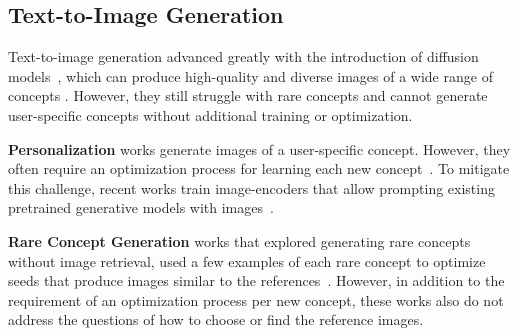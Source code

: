 \vspace{-4pt}
\subsection{Text-to-Image Generation}
Text-to-image generation advanced greatly with the introduction of diffusion models~\cite{ho2020denoising}, which can produce high-quality and diverse images of a wide range of concepts \cite{dhariwal2021diffusion, rombach2022high, podellsdxl, xiao2024omnigen}.
However, they still struggle with rare concepts and cannot generate user-specific concepts without additional training or optimization.

\textbf{Personalization} works generate images of a user-specific concept. However, they often require an optimization process for learning each new concept~\cite{nitzan2022mystyle, galimage, ruiz2023dreambooth, arar2024palp, alaluf2023neural, voynov2023p+, avrahami2023break, kumari2023multi}.
To mitigate this challenge, recent works train image-encoders that allow prompting existing pretrained generative models with images~\cite{ye2023ip,gal2023encoder,wei2023elite,shi2024instantbooth,gal2024lcm,patashnik2025nested}.

\textbf{Rare Concept Generation}
works that explored generating rare concepts without image retrieval, used a few examples of each rare concept to optimize seeds that produce images similar to the references~\cite{samuel2024norm,samuel2024generating}. However, in addition to the requirement of an optimization process per new concept, these works also do not address the questions of how to choose or find the reference images.